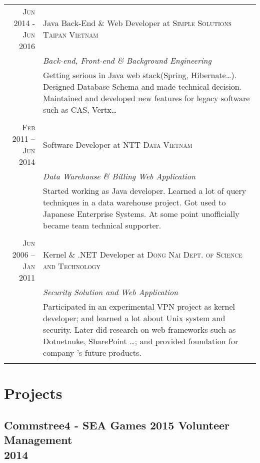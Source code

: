 \documentclass[a4paper,10pt]{article}
\begin{document}
\begin{tabular}{r|p{11cm}}

  \textsc{Jun 2014 - Jun 2016} & Java Back-End \& Web Developer at \textsc{Simple Solutions Taipan Vietnam} \\
  &\emph{Back-end, Front-end \& Background Engineering}\\
  &\footnotesize{
    Getting serious in Java web stack(Spring, Hibernate\ldots).
    Designed Database Schema and made technical decision.
    Maintained and developed new features for legacy software such as CAS, Vertx\ldots}\\
  \multicolumn{2}{c}{} \\

  \textsc{Feb 2011 – Jun 2014} & Software Developer at \textsc{NTT Data Vietnam} \\
  &\emph{Data Warehouse \& Billing Web Application}\\
  &\footnotesize{
    Started working as Java developer.
    Learned a lot of query techniques in a data warehouse project.
    Got used to Japanese Enterprise Systems.
    At some point unofficially became team technical supporter.}\\
  \multicolumn{2}{c}{} \\

  \textsc{Jun 2006 – Jan 2011} & Kernel \& .NET Developer at \textsc{Dong Nai Dept. of Science and Technology} \\
  &\emph{Security Solution and Web Application}\\
  &\footnotesize{
    Participated in an experimental VPN project as kernel developer;
    and learned a lot about Unix system and security.
    Later did research on web frameworks such as Dotnetnuke, SharePoint \ldots;
    and provided foundation for company 's future products.}\\
  \multicolumn{2}{c}{} \\

\end{tabular}

\section{Projects}

\subsection*{Commstree4 - SEA Games 2015 Volunteer Management\\\small 2014}
\end{document}
